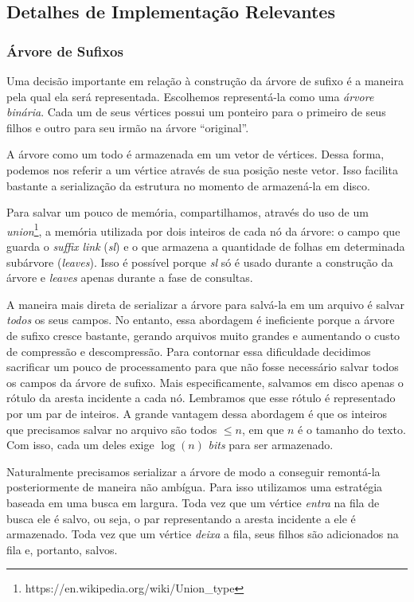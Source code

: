 \documentclass[]{article}
\begin{document}
\subsection{Detalhes de Implementação Relevantes}

\subsubsection{Árvore de Sufixos}

Uma decisão importante em relação à construção da árvore de sufixo é a maneira pela qual ela será representada. Escolhemos representá-la como uma \textit{árvore binária}. Cada um de seus vértices possui um ponteiro para o primeiro de seus filhos e outro para seu irmão na árvore ``original''. 

A árvore como um todo é armazenada em um vetor de vértices. Dessa forma, podemos nos referir a um vértice através de sua posição neste vetor. Isso facilita bastante a serialização da estrutura no momento de armazená-la em disco. 

Para salvar um pouco de memória, compartilhamos, através do uso de um \textit{union}\footnote{https://en.wikipedia.org/wiki/Union\_type}, a memória utilizada por dois inteiros de cada nó da árvore: o campo que guarda o \textit{suffix link} (\textit{sl}) e o que armazena a quantidade de folhas em determinada subárvore (\textit{leaves}). Isso é possível porque \textit{sl} só é usado durante a construção da árvore e \textit{leaves} apenas durante a fase de consultas.

A maneira mais direta de serializar a árvore para salvá-la em um arquivo é salvar \textit{todos} os seus campos. No entanto, essa abordagem é ineficiente porque a árvore de sufixo cresce bastante, gerando arquivos muito grandes e aumentando o custo de compressão e descompressão. Para contornar essa dificuldade decidimos sacrificar um pouco de processamento para que não fosse necessário salvar todos os campos da árvore de sufixo. Mais especificamente, salvamos em disco apenas o rótulo da aresta incidente a cada nó. Lembramos que esse rótulo é representado por um par de inteiros. A grande vantagem dessa abordagem é que os inteiros que precisamos salvar no arquivo são todos $\leq n$, em que $n$ é o tamanho do texto. Com isso, cada um deles exige $\log(n)$ \textit{bits} para ser armazenado.

Naturalmente precisamos serializar a árvore de modo a conseguir remontá-la posteriormente de maneira não ambígua. Para isso utilizamos uma estratégia baseada em uma busca em largura. Toda vez que um vértice \textit{entra} na fila de busca ele é salvo, ou seja, o par representando a aresta incidente a ele é armazenado. Toda vez que um vértice \textit{deixa} a fila, seus filhos são adicionados na fila e, portanto, salvos. 
\end{document}
